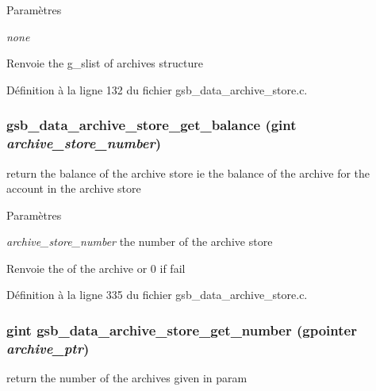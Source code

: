 \begin{DoxyParams}{Paramètres}
\item[{\em none}]\end{DoxyParams}
\begin{DoxyReturn}{Renvoie}
the g\_\-slist of archives structure 
\end{DoxyReturn}


Définition à la ligne 132 du fichier gsb\_\-data\_\-archive\_\-store.c.

\subsubsection[{gsb\_\-data\_\-archive\_\-store\_\-get\_\-balance}]{ gsb\_\-data\_\-archive\_\-store\_\-get\_\-balance (gint {\em archive\_\-store\_\-number})}\label{gsb__data__archive__store_8h_abd95449e6aba688e9b5f6536f2cea027}
return the balance of the archive store ie the balance of the archive for the account in the archive store


\begin{DoxyParams}{Paramètres}
\item[{\em archive\_\-store\_\-number}]the number of the archive store\end{DoxyParams}
\begin{DoxyReturn}{Renvoie}
the of the archive or 0 if fail 
\end{DoxyReturn}


Définition à la ligne 335 du fichier gsb\_\-data\_\-archive\_\-store.c.

\subsubsection[{gsb\_\-data\_\-archive\_\-store\_\-get\_\-number}]{\setlength{\rightskip}{0pt plus 5cm}gint gsb\_\-data\_\-archive\_\-store\_\-get\_\-number (gpointer {\em archive\_\-ptr})}\label{gsb__data__archive__store_8h_a33d414762707f17772146fca8dc8db36}
return the number of the archives given in param


